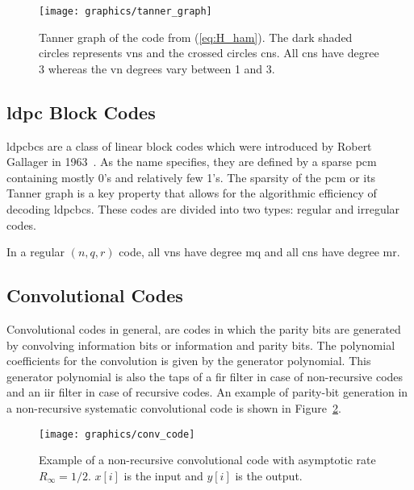 \begin{figure}[htbp]
  \centering
  \texttt{[image: graphics/tanner\_graph]}
  \caption{Tanner graph of the code from (\ref{eq:H_ham}). The dark shaded circles represents \glspl{vn} and the crossed circles \glspl{cn}. All \glspl{cn} have degree 3 whereas the \gls{vn} degrees vary between 1 and 3.}
  \label{fig:tannGraph}
\end{figure}

\subsection{\acrlong{ldpc} Block Codes}
\glspl{ldpcbc} are a class of linear block codes which were introduced by Robert Gallager in 1963~\cite{Gallager1963}. As the name specifies, they are defined by a sparse \gls{pcm} containing mostly 0's and relatively few 1's. The sparsity of the \gls{pcm} or its Tanner graph is a key property that allows for the algorithmic efficiency of decoding \glspl{ldpcbc}. These codes are divided into two types: regular and irregular codes.

In a regular $(n,q,r)$ code, all \glspl{vn} have degree \gls{mq} and all \glspl{cn} have degree \gls{mr}.

\subsection{Convolutional Codes}
Convolutional codes in general, are codes in which the parity bits are generated by convolving information bits or information and parity bits. The polynomial coefficients for the convolution is given by the generator polynomial. This generator polynomial is also the taps of a \gls{fir} filter in case of non-recursive codes and an \gls{iir} filter in case of recursive codes. An example of parity-bit generation in a non-recursive systematic convolutional code is shown in Figure~\ref{fig:conv_code}.
\begin{figure}[htbp]
  \centering
  \texttt{[image: graphics/conv\_code]}
  \caption{Example of a non-recursive convolutional code with asymptotic rate $R_\infty=1/2$. $x[i]$ is the input and $y[i]$ is the output.}
  \label{fig:conv_code}
\end{figure}

